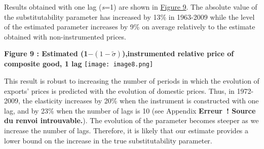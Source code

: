 \documentclass[12pt,twoside,a4paper,notitlepage]{article}
\begin{document}
{Results obtained with one lag (\textit{s}=1) are shown in {\hyperref[ref-010]{Figure 9}}.
The absolute value of the substitutability parameter has increased by 13\% in 1963-2009 while the level of the estimated parameter increases by 9\% on average relatively to the estimate obtained with non-instrumented prices.


\textbf{ \label{ref-010}Figure 9 : Estimated (1${-}(1-\tilde{\sigma })$),instrumented relative price of composite good, 1 lag}
\texttt{[image: image8.png]} 

This result is robust to increasing the number of periods in which the evolution of exports' prices is predicted with the evolution of domestic prices.
Thus, in 1972-2009, the elasticity increases by 20\% when the instrument is constructed with one lag, and by 23\% when the number of lags is 10 (see Appendix \textbf{Erreur~! Source du renvoi introuvable.}).
The evolution of the parameter becomes steeper as we increase the number of lags.
Therefore, it is likely that our estimate provides a lower bound on the increase in the true substitutability parameter.
%
}
\end{document}
